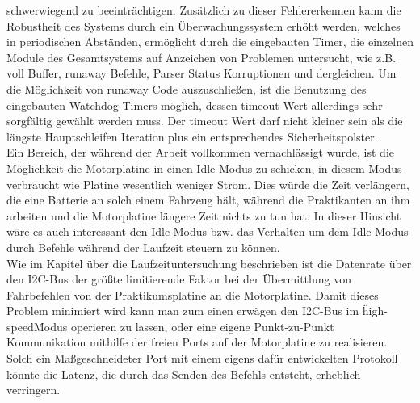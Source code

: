 schwerwiegend zu beeinträchtigen. Zusätzlich zu dieser Fehlererkennen kann die Robustheit des Systems
durch ein Überwachungssystem erhöht werden, welches in periodischen Abständen, ermöglicht durch
die eingebauten Timer, die einzelnen Module des Gesamtsystems auf Anzeichen von Problemen untersucht,
wie z.B. voll Buffer, runaway Befehle, Parser Status Korruptionen und dergleichen. Um die Möglichkeit
von runaway Code auszuschließen, ist die Benutzung des eingebauten Watchdog-Timers möglich, dessen
timeout Wert allerdings sehr sorgfältig gewählt werden muss. Der timeout Wert darf nicht kleiner sein
als die längste Hauptschleifen Iteration plus ein entsprechendes Sicherheitspolster.\\
Ein Bereich, der während der Arbeit vollkommen vernachlässigt wurde, ist die Möglichkeit die
Motorplatine in einen Idle-Modus zu schicken, in diesem Modus verbraucht wie Platine wesentlich weniger
Strom. Dies würde die Zeit verlängern, die eine Batterie an solch einem Fahrzeug hält, während die
Praktikanten an ihm arbeiten und die Motorplatine längere Zeit nichts zu tun hat. In dieser Hinsicht
wäre es auch interessant den Idle-Modus bzw. das Verhalten um dem Idle-Modus durch Befehle während der
Laufzeit steuern zu können.\\
Wie im Kapitel über die Laufzeituntersuchung beschrieben ist die Datenrate über den I2C-Bus der größte
limitierende Faktor bei der Übermittlung von Fahrbefehlen von der Praktikumsplatine an die
Motorplatine. Damit dieses Problem minimiert wird kann man zum einen erwägen den I2C-Bus im \"high-speed\"
Modus operieren zu lassen, oder eine eigene Punkt-zu-Punkt Kommunikation mithilfe der freien Ports auf der
Motorplatine zu realisieren. Solch ein Maßgeschneideter Port mit einem eigens dafür entwickelten Protokoll
könnte die Latenz, die durch das Senden des Befehls entsteht, erheblich verringern.
